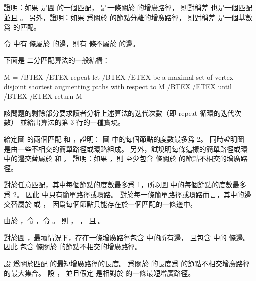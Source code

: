 \startigBase[a]\startitem
證明：如果  是圖  的一個匹配，  是一條關於  的增廣路徑，
則對稱差  也是一個匹配並且 。
另外，證明：如果  爲關於  的節點分離的增廣路徑，
則對稱差  是一個基數爲  的匹配。
\stopitem\stopigBase

\startANSWER
令  中有  條屬於  的邊，則有  條不屬於  的邊。
\stopANSWER

下面是  二分匹配算法的一般結構：

\startCLRS
M = /BTEX \m{\emptyset} /ETEX
repeat
	let /BTEX  /ETEX be a maximal set of vertex-disjoint
		shortest augmenting paths with respect to M
	/BTEX  /ETEX
until /BTEX  /ETEX
return M
\stopCLRS

該問題的剩餘部分要求讀者分析上述算法的迭代次數（即 {\EMP repeat} 循環的迭代次數）
並給出算法的第 3 行的一種實現。

\startigBase[continue]\startitem
給定圖  的兩個匹配  和 ，證明：
圖  中的每個節點的度數最多爲 2。
同時證明圖  是由一些不相交的簡單路徑或環路組成。
另外，試說明每條這樣的簡單路徑或環中的邊交替屬於  和 。
證明：如果 ，則  至少包含  條關於  的節點不相交的增廣路徑。
\stopitem\stopigBase

\startANSWER
對於任意匹配，其中每個節點的度數最多爲 1，所以圖  中的每個節點的度數最多爲 2。
因此  中只有簡單路徑或環路。
對於每一條簡單路徑或環路而言，其中的邊交替屬於  或 ，
因爲每個節點只能存在於一個匹配的一條邊中。

由於 ，令 ，令 。
則 ， ，
且 。

對於圖 ，最壞情況下，存在一條增廣路徑包含  中的所有邊，
且包含  中的  條邊。
因此  包含  條關於  的節點不相交的增廣路徑。
\stopANSWER

設  爲關於匹配  的最短增廣路徑的長度。
  爲關於  的長度爲  的節點不相交增廣路徑的最大集合。
設 ，
並且假定  是相對於  的一條最短增廣路徑。

